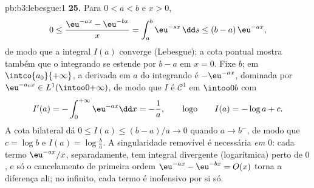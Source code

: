 \begin{solution}{pb:b3:lebesgue:1}
\textbf{25.} Para $0 < a < b$ e $x > 0$,
\[
0 \leq \frac{\eu^{-ax} - \eu^{-bx}}{x}
= \int_a^b \eu^{-sx}\,\dd s \leq (b - a)\,\eu^{-ax},
\]
de modo que a integral $I(a)$ converge (Lebesgue); a cota pontual
mostra também que o integrando se estende  por $b -
a$ em $x = 0$. Fixe $b$; em $\intco{a_0}{+\infty}$, a
derivada em $a$ do integrando é $-\eu^{-ax}$, dominada por
$\eu^{-a_0x} \in L^1(\intoo0{+\infty})$, de modo que $I$ é $\mathcal
C^1$ em $\intoo0b$ com
\[
I'(a) = -\int_0^{+\infty}\eu^{-ax}\dd x = -\frac1a,
\qquad\text{logo}\qquad
I(a) = -\log a + c .
\]
A cota bilateral dá $0 \leq I(a) \leq (b-a)/a \to 0$ quando
$a \to b^-$, de modo que $c = \log b$ e $I(a) = \log\frac ba$. A
singularidade removível é necessária \emph{em $0$}: cada termo
$\eu^{-ax}/x$, separadamente, tem integral divergente (logarítmica)
perto de $0$, e só o cancelamento de primeira ordem
$\eu^{-ax} - \eu^{-bx} = O(x)$ torna a diferença
 ali; no infinito, cada termo é inofensivo por si
só.
\end{solution}

